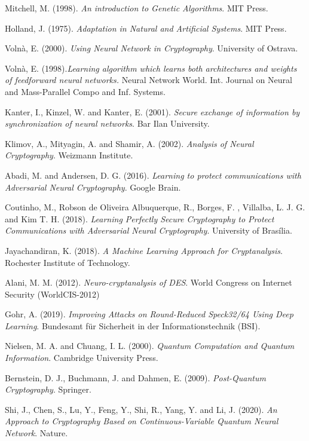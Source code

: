 \documentclass[%
    corpo=11pt,
    twoside,
    stile=classica,
    oldstyle,
    autoretitolo,
    tipotesi=magistrale,
    greek,
    evenboxes,
    english
]{toptesi}
\begin{document}
\begin{thebibliography}{99}
 {\sc Mitchell, M.} (1998). \textit{An introduction to Genetic Algorithms}. MIT Press.

 {\sc Holland, J.} (1975). \textit{Adaptation in Natural and Artificial Systems}. MIT Press. 

 {\sc Volnà, E.} (2000). \textit{Using Neural Network in Cryptography}. University of Ostrava.

 {\sc Volnà, E.} (1998).\textit{Learning algorithm which learns both architectures and weights of feedforward neural networks.} Neural Network World. Int. Journal on Neural and Mass-Parallel Compo and Inf. Systems.

 {\sc Kanter, I.}, {\sc Kinzel, W.} and {\sc Kanter, E.} (2001). \textit{Secure exchange of information by synchronization of neural networks}. Bar Ilan University.

 {\sc Klimov, A.}, {\sc Mityagin, A.} and {\sc Shamir, A.} (2002). \textit{Analysis of Neural Cryptography}. Weizmann Institute.


 {\sc Abadi, M.} and {\sc Andersen, D. G.} (2016). \textit{Learning to protect communications with Adversarial Neural Cryptography}. Google Brain.

 {\sc Coutinho, M.}, {\sc Robson de Oliveira Albuquerque, R.}, {\sc Borges, F. }, {\sc Villalba, L. J. G.} and  {\sc Kim T. H.} (2018). \textit{Learning Perfectly Secure Cryptography to Protect Communications with Adversarial Neural Cryptography}. University of Brasília.

 {\sc Jayachandiran, K.} (2018). \textit{A Machine Learning Approach for Cryptanalysis}. Rochester Institute of Technology.

 {\sc Alani, M. M.} (2012). \textit{Neuro-cryptanalysis of DES}. World Congress on Internet Security (WorldCIS-2012)

 {\sc Gohr, A.} (2019). \textit{Improving Attacks on Round-Reduced Speck32/64 Using Deep Learning}. Bundesamt für Sicherheit in der Informationstechnik (BSI).

 {\sc Nielsen, M. A.} and {\sc Chuang, I. L.} (2000). \textit{Quantum Computation and Quantum Information}. Cambridge University Press.

 {\sc Bernstein, D. J.}, {\sc Buchmann, J.} and {\sc Dahmen, E.} (2009). \textit{Post-Quantum Cryptography}. Springer.

 {\sc Shi, J.}, {\sc Chen, S.}, {\sc Lu, Y.}, {\sc Feng, Y.}, {\sc Shi, R.}, {\sc Yang, Y.} and {\sc Li, J.} (2020). \textit{An Approach to Cryptography Based on Continuous-Variable Quantum Neural Network}. Nature.

\end{thebibliography}
\end{document}
